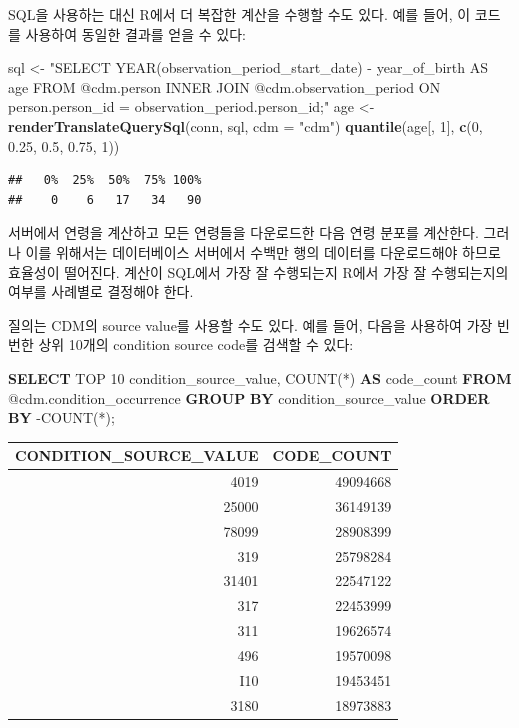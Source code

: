 \documentclass[11pt]{book}
\newenvironment{Shaded}{\begin{snugshade}}{\end{snugshade}}
\newcommand{\KeywordTok}[1]{\textcolor[rgb]{0.13,0.29,0.53}{\textbf{#1}}}
\newcommand{\DataTypeTok}[1]{\textcolor[rgb]{0.13,0.29,0.53}{#1}}
\newcommand{\DecValTok}[1]{\textcolor[rgb]{0.00,0.00,0.81}{#1}}
\newcommand{\FloatTok}[1]{\textcolor[rgb]{0.00,0.00,0.81}{#1}}
\newcommand{\StringTok}[1]{\textcolor[rgb]{0.31,0.60,0.02}{#1}}
\newcommand{\FunctionTok}[1]{\textcolor[rgb]{0.00,0.00,0.00}{#1}}
\newcommand{\NormalTok}[1]{#1}
\theoremstyle{definition}
\theoremstyle{definition}
\theoremstyle{definition}
\theoremstyle{remark}
\begin{document}
SQL을 사용하는 대신 R에서 더 복잡한 계산을 수행할 수도 있다. 예를 들어,
이 코드를 사용하여 동일한 결과를 얻을 수 있다:

\begin{Shaded}
\begin{Highlighting}[]
\NormalTok{sql <-}\StringTok{ "SELECT YEAR(observation_period_start_date) -}
\StringTok{               year_of_birth AS age}
\StringTok{FROM @cdm.person}
\StringTok{INNER JOIN @cdm.observation_period}
\StringTok{  ON person.person_id = observation_period.person_id;"}
\NormalTok{age <-}\StringTok{ }\KeywordTok{renderTranslateQuerySql}\NormalTok{(conn, sql, }\DataTypeTok{cdm =} \StringTok{"cdm"}\NormalTok{)}
\KeywordTok{quantile}\NormalTok{(age[, }\DecValTok{1}\NormalTok{], }\KeywordTok{c}\NormalTok{(}\DecValTok{0}\NormalTok{, }\FloatTok{0.25}\NormalTok{, }\FloatTok{0.5}\NormalTok{, }\FloatTok{0.75}\NormalTok{, }\DecValTok{1}\NormalTok{))}
\end{Highlighting}
\end{Shaded}

\begin{verbatim}
##   0%  25%  50%  75% 100% 
##    0    6   17   34   90
\end{verbatim}

서버에서 연령을 계산하고 모든 연령들을 다운로드한 다음 연령 분포를
계산한다. 그러나 이를 위해서는 데이터베이스 서버에서 수백만 행의
데이터를 다운로드해야 하므로 효율성이 떨어진다. 계산이 SQL에서 가장 잘
수행되는지 R에서 가장 잘 수행되는지의 여부를 사례별로 결정해야 한다.

질의는 CDM의 source value를 사용할 수도 있다. 예를 들어, 다음을 사용하여
가장 빈번한 상위 10개의 condition source code를 검색할 수 있다:

\begin{Shaded}
\begin{Highlighting}[]
\KeywordTok{SELECT}\NormalTok{ TOP }\DecValTok{10}\NormalTok{ condition_source_value, }
  \FunctionTok{COUNT}\NormalTok{(*) }\KeywordTok{AS}\NormalTok{ code_count}
\KeywordTok{FROM}\NormalTok{ @cdm.condition_occurrence}
\KeywordTok{GROUP} \KeywordTok{BY}\NormalTok{ condition_source_value}
\KeywordTok{ORDER} \KeywordTok{BY}\NormalTok{ -COUNT(*);}
\end{Highlighting}
\end{Shaded}

\begin{longtable}[]{@{}rr@{}}
\toprule
CONDITION\_SOURCE\_VALUE & CODE\_COUNT\tabularnewline
\midrule
\endhead
4019 & 49094668\tabularnewline
25000 & 36149139\tabularnewline
78099 & 28908399\tabularnewline
319 & 25798284\tabularnewline
31401 & 22547122\tabularnewline
317 & 22453999\tabularnewline
311 & 19626574\tabularnewline
496 & 19570098\tabularnewline
I10 & 19453451\tabularnewline
3180 & 18973883\tabularnewline
\bottomrule
\end{longtable}
\end{document}
